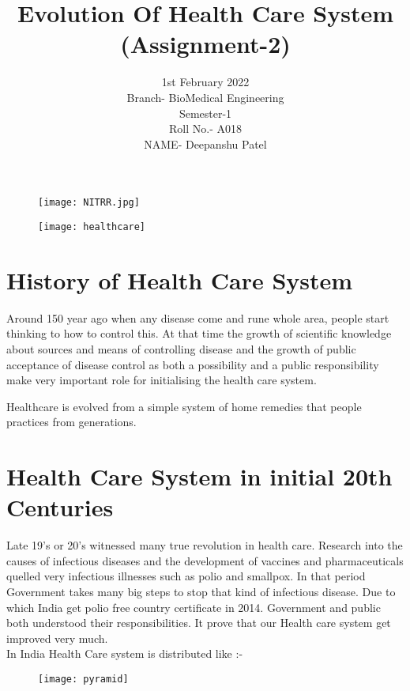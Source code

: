 \documentclass[12pt]{article}
\title{Evolution Of Health Care System\\(Assignment-2)}
\date{1st February 2022\\Branch- BioMedical Engineering\\Semester-1\\Roll No.- A018\\NAME- Deepanshu Patel\\ }
\begin{document}
\begin{figure}
\centering
\texttt{[image: NITRR.jpg]}
\end{figure}

\maketitle

\clearpage

\begin{figure}
\centering
\texttt{[image: healthcare]}
\end{figure}


 \section{History of Health Care System}
  
 Around 150 year ago when any disease come and rune whole area, people start thinking to how to control this. At that time the growth of scientific knowledge about sources and means of controlling disease and the growth of public acceptance of disease control as both a possibility and a public responsibility make very important role for initialising the health care system.
 
 Healthcare is evolved from a simple system of home remedies that people practices from generations.\\
 
   

 
 \section{Health Care System in initial 20th Centuries}
 
  Late 19's or 20's witnessed many true revolution in health care. Research into the causes of infectious diseases and the development of vaccines and pharmaceuticals quelled very infectious illnesses such as polio and smallpox. In that period Government takes many big steps to stop that kind of infectious disease. Due to which India get polio free country certificate in 2014. Government and public both understood their responsibilities. It prove that our Health care system get improved very much.\\
  In India Health Care system is distributed like :-
 
\begin{figure}[h]
 \centering
 \texttt{[image: pyramid]}
\end{figure}
 
\end{document}
